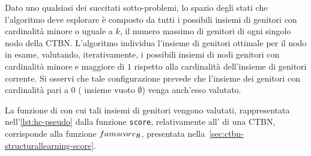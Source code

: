 Dato uno qualsiasi dei succitati sotto-problemi, lo spazio degli stati che l'algoritmo \emph{\keyword{\hc{}}} deve esplorare è composto da tutti i possibili insiemi di genitori con cardinalità minore o uguale a $k$, il numero massimo di genitori di ogni singolo nodo della \acs{CTBN}. L'algoritmo \emph{\keyword{\hc{}}} individua l'insieme di genitori ottimale per il nodo in esame, valutando, iterativamente, i possibili insiemi di nodi genitori con cardinalità minore e maggiore di $1$ rispetto alla cardinalità dell'insieme di genitori corrente. Si osservi che tale configurazione prevede che l'insieme dei genitori con cardinalità pari a $0$ (\ie{} insieme vuoto $\emptyset$) venga anch'esso valutato.

La funzione di \emph{} con cui tali insiemi di genitori vengono valutati, rappresentata nell'\autoref{lst:hc-pseudo} dalla funzione \lstinline[]|score|, relativamente all' di una \acs{CTBN}, corrisponde alla funzione $famscore_{\mathcal{B}}$, presentata nella~\vref{sec:ctbn-structurallearning-score}.


